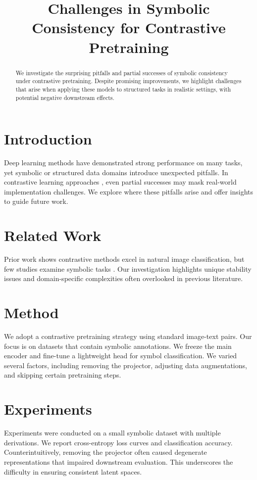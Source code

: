 \documentclass{article}
\title{Challenges in Symbolic Consistency for Contrastive Pretraining}
\author{}
\date{}
\begin{document}
\maketitle

\begin{abstract}
We investigate the surprising pitfalls and partial successes of symbolic consistency under contrastive pretraining. Despite promising improvements, we highlight challenges that arise when applying these models to structured tasks in realistic settings, with potential negative downstream effects. 
\end{abstract}

\section{Introduction}
Deep learning methods have demonstrated strong performance on many tasks, yet symbolic or structured data domains introduce unexpected pitfalls. In contrastive learning approaches \citep{chen2020simple,radford2021learning}, even partial successes may mask real-world implementation challenges. We explore where these pitfalls arise and offer insights to guide future work.

\section{Related Work}
Prior work \citep{chen2020simple,radford2021learning} shows contrastive methods excel in natural image classification, but few studies examine symbolic tasks \citep{someOtherRef2021}. Our investigation highlights unique stability issues and domain-specific complexities often overlooked in previous literature.

\section{Method}
We adopt a contrastive pretraining strategy using standard image-text pairs. Our focus is on datasets that contain symbolic annotations. We freeze the main encoder and fine-tune a lightweight head for symbol classification. We varied several factors, including removing the projector, adjusting data augmentations, and skipping certain pretraining steps.

\section{Experiments}
Experiments were conducted on a small symbolic dataset with multiple derivations. We report cross-entropy loss curves and classification accuracy. Counterintuitively, removing the projector often caused degenerate representations that impaired downstream evaluation. This underscores the difficulty in ensuring consistent latent spaces.
\end{document}
